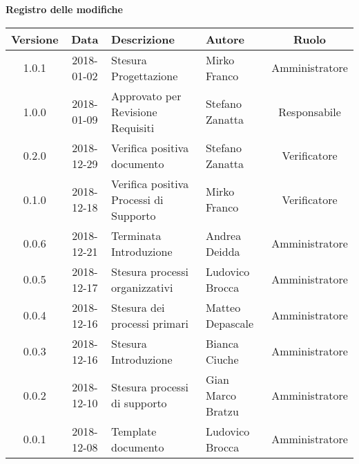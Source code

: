 \begin{center}
	\textbf{Registro delle modifiche}
	\end{center}
	\begin{center}
		\begin{tabularx}{\textwidth}{|c|c|X|X|c|}
			\hline
			\textbf{Versione} & \textbf{Data} & \textbf{Descrizione} & \textbf{Autore} & \textbf{Ruolo} \\
			\hline
			1.0.1 & 2018-01-02 & Stesura Progettazione & Mirko Franco & Amministratore \\
			\hline
			1.0.0 & 2018-01-09 & Approvato per Revisione Requisiti & Stefano Zanatta & Responsabile\\
			\hline
			0.2.0 & 2018-12-29 & Verifica positiva documento & Stefano Zanatta & Verificatore\\
			\hline
			0.1.0 & 2018-12-18 & Verifica positiva Processi di Supporto & Mirko Franco & Verificatore\\
			\hline
			0.0.6 & 2018-12-21 & Terminata Introduzione & Andrea Deidda & Amministratore\\
			\hline
			0.0.5 & 2018-12-17 & Stesura processi organizzativi & Ludovico Brocca & Amministratore\\
			\hline
			0.0.4 & 2018-12-16 & Stesura dei processi primari & Matteo Depascale & Amministratore\\
			\hline
			0.0.3 & 2018-12-16 & Stesura Introduzione & Bianca Ciuche & Amministratore\\
			\hline
			0.0.2 & 2018-12-10 & Stesura processi di supporto & Gian Marco Bratzu & Amministratore\\	
			\hline
			0.0.1 & 2018-12-08 & Template documento  & Ludovico Brocca & Amministratore\\
			\hline
		\end{tabularx}
	\end{center}

\newpage
